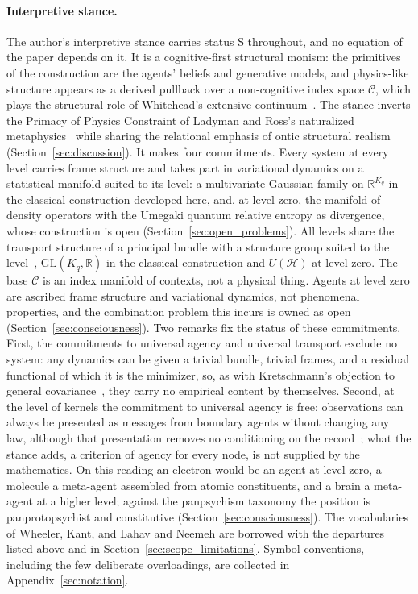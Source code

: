 \documentclass[11pt]{article}
\begin{document}
\paragraph{Interpretive stance.}\label{sec:cognitive_first} The author's interpretive stance carries status S throughout, and no equation of the paper depends on it. It is a cognitive-first structural monism: the primitives of the construction are the agents' beliefs and generative models, and physics-like structure appears as a derived pullback over a non-cognitive index space $\mathcal{C}$, which plays the structural role of Whitehead's extensive continuum~\cite{Whitehead1929}. The stance inverts the Primacy of Physics Constraint of Ladyman and Ross's naturalized metaphysics~\cite{Ladyman2007} while sharing the relational emphasis of ontic structural realism~\cite{Ladyman1998} (Section~\ref{sec:discussion}). It makes four commitments. Every system at every level carries frame structure and takes part in variational dynamics on a statistical manifold suited to its level: a multivariate Gaussian family on $\mathbb{R}^{K_q}$ in the classical construction developed here, and, at level zero, the manifold of density operators with the Umegaki quantum relative entropy as divergence, whose construction is open (Section~\ref{sec:open_problems}). All levels share the transport structure of a principal bundle with a structure group suited to the level~\cite{Nakahara2003}, $\mathrm{GL}(K_q,\mathbb{R})$ in the classical construction and $U(\mathcal{H})$ at level zero. The base $\mathcal{C}$ is an index manifold of contexts, not a physical thing. Agents at level zero are ascribed frame structure and variational dynamics, not phenomenal properties, and the combination problem this incurs is owned as open (Section~\ref{sec:consciousness}). Two remarks fix the status of these commitments. First, the commitments to universal agency and universal transport exclude no system: any dynamics can be given a trivial bundle, trivial frames, and a residual functional of which it is the minimizer, so, as with Kretschmann's objection to general covariance~\cite{Kretschmann1917, Norton1993}, they carry no empirical content by themselves. Second, at the level of kernels the commitment to universal agency is free: observations can always be presented as messages from boundary agents without changing any law, although that presentation removes no conditioning on the record~\cite[Ch.~5]{DennisGaugeVFE2026}; what the stance adds, a criterion of agency for every node, is not supplied by the mathematics. On this reading an electron would be an agent at level zero, a molecule a meta-agent assembled from atomic constituents, and a brain a meta-agent at a higher level; against the panpsychism taxonomy the position is panprotopsychist and constitutive (Section~\ref{sec:consciousness}). The vocabularies of Wheeler, Kant, and Lahav and Neemeh are borrowed with the departures listed above and in Section~\ref{sec:scope_limitations}. Symbol conventions, including the few deliberate overloadings, are collected in Appendix~\ref{sec:notation}.
\end{document}

